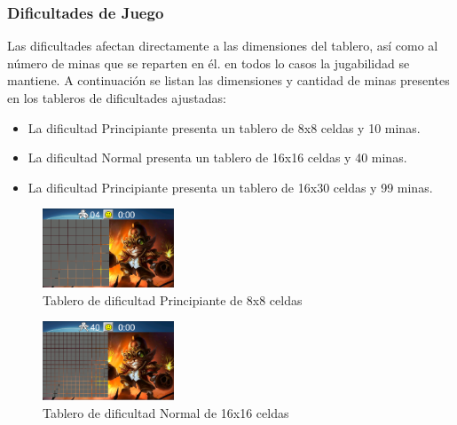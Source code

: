 \documentclass[11pt]{article} %
\begin{document}
\subsubsection{\textbf{Dificultades de Juego}}

Las dificultades afectan directamente a las dimensiones del tablero, as\'i como al n\'umero de minas que se reparten en \'el. en todos lo casos la jugabilidad se mantiene. A continuaci\'on se listan las dimensiones y cantidad de minas presentes en los tableros de dificultades ajustadas:

\begin{itemize}
\item La dificultad Principiante presenta un tablero de 8x8 celdas y 10 minas.
\item La dificultad Normal presenta un tablero de 16x16 celdas y 40 minas.
\item La dificultad Principiante presenta un tablero de 16x30 celdas y 99 minas.
\end{itemize}

\begin{center}

	\begin{figure}[h!]
  		\centering
    		\includegraphics[width=0.35\textwidth]{imagenes/tableroPrincipiante.PNG}
  		\caption{Tablero de dificultad Principiante de 8x8 celdas}
		\label{fig:tableroprincipiante}
	\end{figure}
\end{center} 

\begin{center}

	\begin{figure}[h!]
  		\centering
    		\includegraphics[width=0.35\textwidth]{imagenes/tableroNormal.PNG}
  		\caption{Tablero de dificultad Normal de 16x16 celdas}
		\label{fig:tableronormal}
	\end{figure}
\end{center} 
\end{document}
